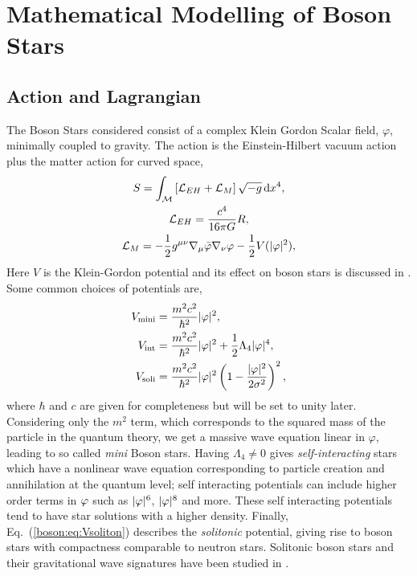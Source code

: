 





\section{Mathematical Modelling of Boson Stars}
\subsection{Action and Lagrangian} \label{boson:sec:action}
The Boson Stars considered consist of a complex Klein Gordon Scalar field, $\varphi$, minimally coupled to gravity. The action is the Einstein-Hilbert vacuum action plus the matter action for curved space,
\begin{gather} S = \int_\mathcal{M}\left[\mathcal{L}_{EH} + \mathcal{L}_M\right] \sqrt{-g}\,\dd x^4, \\
 \mathcal{L}_{EH} = \frac{c^4}{16\pi G}R, \\
 \mathcal{L}_{M} =-\frac{1}{2}g^{\mu\nu}\nabla_\mu \bar{\varphi} \nabla_\nu \varphi - \frac{1}{2}V(|\varphi|^2),  \end{gather}
Here $V$ is the Klein-Gordon potential and its effect on boson stars is discussed in \cite{Schunck:2003kk} \cite{Liebling:2012fv}. Some common choices of potentials are,
\begin{align}
V_{\rm mini} &= \frac{m^2 c^2}{\hbar^2 }|\varphi|^2,\label{boson:eq:Vmini} \\
V_{\rm int} &= \frac{m^2 c^2}{\hbar^2 }|\varphi|^2 + \frac{1}{2}\Lambda_4|\varphi|^4 ,\\
V_{\rm soli} &= \frac{m^2 c^2}{\hbar^2 }|\varphi|^2\left(1-\frac{|\varphi|^2}{2\sigma^2}\right)^2 , \label{boson:eq:Vsoliton}
\end{align}
where $\hbar$ and $c$ are given for completeness but will be set to unity later.
Considering only the $m^2$ term, which corresponds to the squared mass of the particle in the quantum theory, we get a massive wave equation linear in $\varphi$, leading to so called {\it mini} Boson stars. Having $\Lambda_4\neq0$ gives {\it self-interacting} stars which have a nonlinear wave equation corresponding to particle creation and annihilation at the quantum level; self interacting potentials can include higher order terms in $\varphi$ such as $|\varphi|^6$, $|\varphi|^8$ and more. These self interacting potentials tend to have star solutions with a higher density. Finally, Eq.~(\ref{boson:eq:Vsoliton}) describes the {\it solitonic} potential, giving rise to boson stars with compactness comparable to neutron stars. Solitonic boson stars and their gravitational
wave signatures have been studied in \cite{Palenzuela:2017kcg}.

